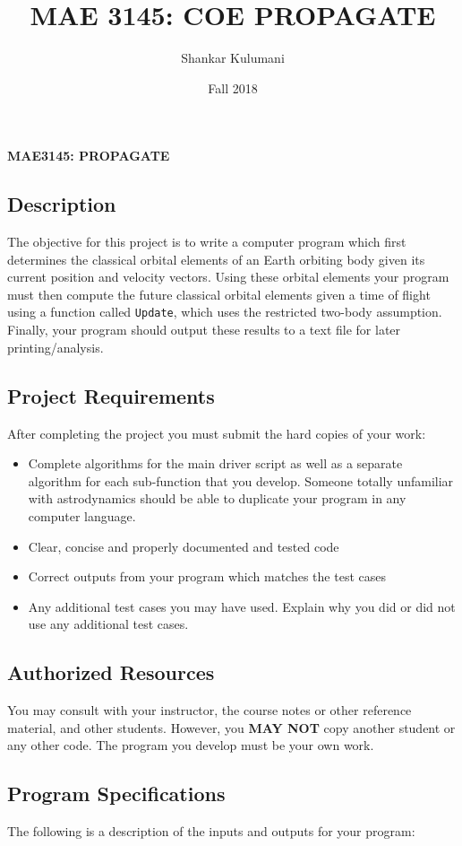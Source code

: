 \documentclass[11pt, reqno]{article}    %
\title{MAE 3145: COE PROPAGATE}
\author{Shankar Kulumani}
\date{Fall 2018}                          %
\begin{document}
\begin{center}
{\Large \textbf{MAE3145: PROPAGATE}}
\end{center}
\subsection*{Description}

The objective for this project is to write a computer program which first determines the classical orbital elements of an Earth orbiting body given its current position and velocity vectors. 
Using these orbital elements your program must then compute the future classical orbital elements given a time of flight using a function called \texttt{Update}, which uses the restricted two-body assumption.
Finally, your program should output these results to a text file for later printing/analysis. 

\subsection*{Project Requirements}
After completing the project you must submit the hard copies of your work:
\begin{itemize}
    \item Complete algorithms for the main driver script as well as a separate algorithm for each sub-function that you develop.
        Someone totally unfamiliar with astrodynamics should be able to duplicate your program in any computer language.
    \item Clear, concise and properly documented and tested code
    \item Correct outputs from your program which matches the test cases
    \item Any additional test cases you may have used. 
        Explain why you did or did not use any additional test cases.
\end{itemize}

\subsection*{Authorized Resources}
You may consult with your instructor, the course notes or other reference material, and other students. 
However, you \textbf{MAY NOT} copy another student or any other code. 
The program you develop must be your own work.

\subsection*{Program Specifications}
The following is a description of the inputs and outputs for your program:
\end{document}
